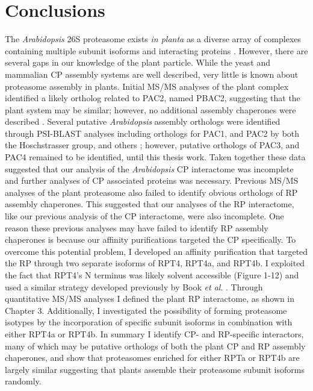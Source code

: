 \section{Conclusions}
The \textit{Arabidopsis} 26S proteasome exists \textit{in planta} as a diverse array of complexes containing multiple subunit isoforms and interacting proteins \citep{book10, fu99, yang04}. However, there are several gaps in our knowledge of the plant particle.  While the yeast and mammalian CP assembly systems are well described, very little is known about proteasome assembly in plants. Initial MS/MS analyses of the plant complex identified a likely ortholog related to PAC2, named PBAC2, suggesting that the plant system may be similar; however, no additional assembly chaperones were described \citep{book10}. Several putative \textit{Arabidopsis} assembly orthologs were identified through PSI-BLAST analyses including orthologs for PAC1, and PAC2 by both the Hoschstrasser group, and others \citep{kusmierczyk11, le07}; however, putative orthologs of PAC3, and PAC4 remained to be identified, until this thesis work. Taken together these data suggested that our analysis of the \textit{Arabidopsis} CP interactome was incomplete and further analyses of CP associated proteins was necessary.
Previous MS/MS analyses of the plant proteasome also failed to identify obvious orthologs of RP assembly chaperones. This suggested that our analyses of the RP interactome, like our previous analysis of the CP interactome, were also incomplete. One reason these previous analyses may have failed to identify RP assembly chaperones is because our affinity purifications targeted the CP specifically. To overcome this potential problem, I developed an affinity purification that targeted the RP through two separate isoforms of RPT4, RPT4a, and RPT4b. I exploited the fact that RPT4’s N terminus was likely solvent accessible (Figure 1-12) and used a similar strategy developed previously by Book \textit{et al}. \citep{book10}. Through quantitative MS/MS analyses I defined the plant RP interactome, as shown in Chapter 3. Additionally, I investigated the possibility of forming proteasome isotypes by the incorporation of specific subunit isoforms in combination with either RPT4a or RPT4b.  In summary I identify CP- and RP-specific interactors, many of which may be putative orthologs of both the plant CP and RP assembly chaperones, and show that proteasomes enriched for either RPTa or RPT4b are largely similar suggesting that plants assemble their proteasome subunit isoforms randomly.

